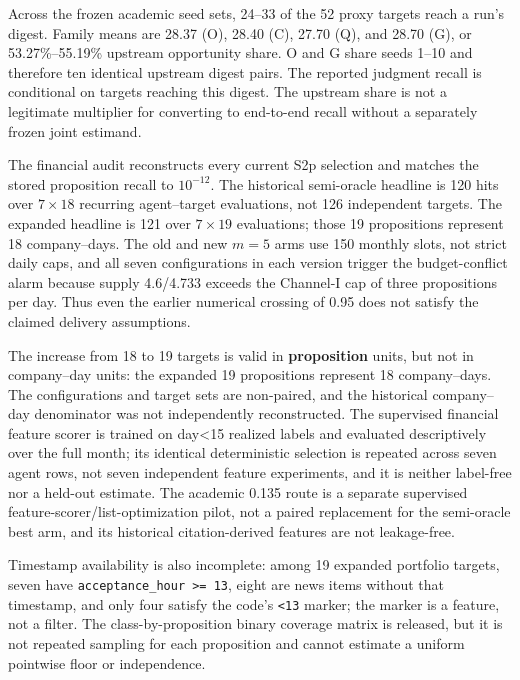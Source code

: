 \documentclass[
  11pt]{article}
\begin{document}
Across the frozen academic seed sets, 24--33 of the 52 proxy targets
reach a run's digest. Family means are 28.37 (O), 28.40 (C), 27.70 (Q),
and 28.70 (G), or 53.27\%--55.19\% upstream opportunity share. O and G
share seeds 1--10 and therefore ten identical upstream digest pairs. The
reported judgment recall is conditional on targets reaching this digest.
The upstream share is not a legitimate multiplier for converting to
end-to-end recall without a separately frozen joint estimand.

The financial audit reconstructs every current S2p selection and matches
the stored proposition recall to \(10^{-12}\). The historical
semi-oracle headline is 120 hits over \(7\times18\) recurring
agent--target evaluations, not 126 independent targets. The expanded
headline is 121 over \(7\times19\) evaluations; those 19 propositions
represent 18 company--days. The old and new \(m=5\) arms use 150 monthly
slots, not strict daily caps, and all seven configurations in each
version trigger the budget-conflict alarm because supply 4.6/4.733
exceeds the Channel-I cap of three propositions per day. Thus even the
earlier numerical crossing of 0.95 does not satisfy the claimed delivery
assumptions.

The increase from 18 to 19 targets is valid in \textbf{proposition}
units, but not in company--day units: the expanded 19 propositions
represent 18 company--days. The configurations and target sets are
non-paired, and the historical company--day denominator was not
independently reconstructed. The supervised financial feature scorer is
trained on day\textless15 realized labels and evaluated descriptively
over the full month; its identical deterministic selection is repeated
across seven agent rows, not seven independent feature experiments, and
it is neither label-free nor a held-out estimate. The academic 0.135
route is a separate supervised feature-scorer/list-optimization pilot,
not a paired replacement for the semi-oracle best arm, and its
historical citation-derived features are not leakage-free.

Timestamp availability is also incomplete: among 19 expanded portfolio
targets, seven have \texttt{acceptance\_hour\ \textgreater{}=\ 13},
eight are news items without that timestamp, and only four satisfy the
code's \texttt{\textless{}13} marker; the marker is a feature, not a
filter. The class-by-proposition binary coverage matrix is released, but
it is not repeated sampling for each proposition and cannot estimate a
uniform pointwise floor or independence.
\end{document}
